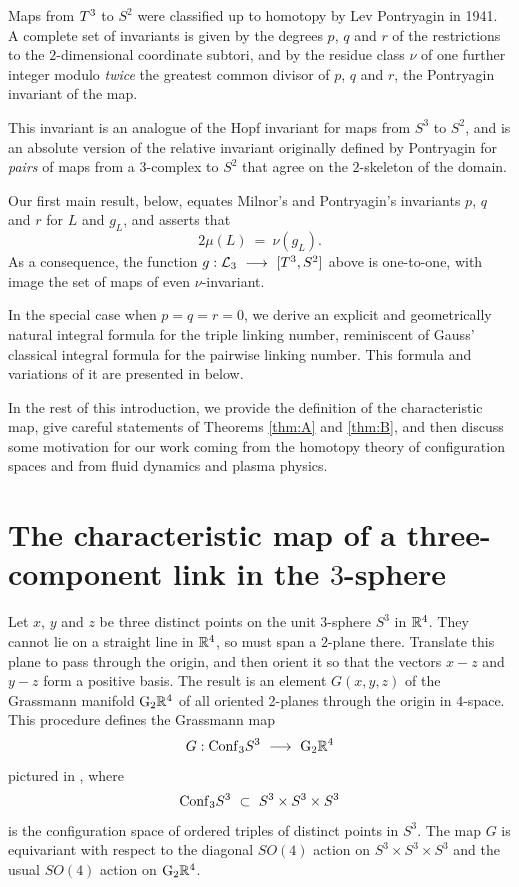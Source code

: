Maps from $T^3$ to $S^2$  were classified up to homotopy by Lev Pontryagin in 1941.   A complete set of invariants is given by the degrees $p$, $q$ and $r$ of the restrictions to the $2$-dimensional coordinate subtori, and by the residue class $\nu$ of one further integer modulo {\it twice} the greatest common divisor of $p$, $q$ and $r$, the {\itb Pontryagin invariant} of the map.  

This invariant is an analogue of the Hopf invariant for maps from $S^3$ to $S^2$, and is an absolute version of the relative invariant originally defined by Pontryagin for {\it pairs} of maps from a $3$-complex to $S^2$ that agree on the $2$-skeleton of the domain.  

Our first main result,  below, equates Milnor's and Pontryagin's invariants $p$, $q$ and $r$ for $L$ and $g_L$, and asserts that 
$$
2\mu(L) \ = \ \nu(g_L).
$$
As a consequence, the function $g:\mathcal L_3\  \longrightarrow \ [T^3,S^2]$ above is one-to-one, with image the set of maps of even $\nu$-invariant.   

In the special case when $p=q=r=0$, we derive an explicit and geometrically natural integral formula for the triple linking number, reminiscent of Gauss' classical integral formula for the pairwise linking number.  This formula and variations of it are presented in  below.

In the rest of this introduction, we provide the definition of the characteristic map, give careful statements of Theorems \ref{thm:A} and \ref{thm:B}, and then discuss some motivation for our work coming from the homotopy theory of configuration spaces and from fluid dynamics and plasma physics. 

   
\part{The characteristic map of a three-component link in the $3$-sphere}

Let $x$, $y$ and $z$ be three distinct points on the unit $3$-sphere $S^3$ in $\mathbb R^4$.  They cannot lie on a straight line in $\mathbb R^4$,  so must span a $2$-plane there.  Translate this plane to pass through the origin, and then orient it so that the vectors $x-z$ and $y-z$ form a positive basis.  The result is an element $G(x,y,z)$ of the Grassmann manifold $\mathrm{G}_2\mathbb R^4$ of all oriented 2-planes through the origin in $4$-space.  This procedure defines the {\itb Grassmann map} 
$$
G: \mathrm{Conf}_{3}S^3 \ \longrightarrow \ \mathrm{G}_2\mathbb R^4
$$
pictured in , where 
$$
\mathrm{Conf}_{3}S^3\ \subset \ S^3 \times S^3 \times S^3
$$ 
is the configuration space of ordered triples of distinct points in $S^3$.  The map $G$ is equivariant with respect to the diagonal $SO(4)$ action on $S^3 \times S^3 \times S^3$ and the usual $SO(4)$ action on $\mathrm{G}_2\mathbb R^4$.

